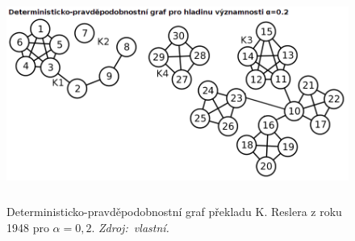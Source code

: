 \documentclass[dp.tex]{subfiles}
\begin{document}
\begin{figure}[h]
	\includegraphics[max width=\textwidth,height=7cm, keepaspectratio=true]{imgs-99-priloha-d/l_d_20}
	\caption[Deterministicko-pravděpodobnostní graf překladu K. Reslera z roku 1948 pro $\alpha = 0{,}2$]
            {Deterministicko-pravděpodobnostní graf překladu K. Reslera z roku 1948 pro $\alpha = 0{,}2$. \textit{Zdroj:~vlastní.}}
	\label{fig:l_d_20}
\end{figure}
\end{document}
